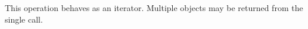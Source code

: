 \item This operation behaves as an iterator.  Multiple objects may be returned
    from the single call.
